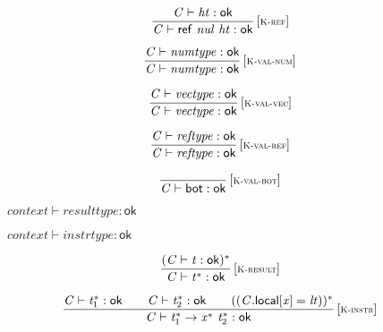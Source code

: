 $$
\begin{array}{@{}c@{}}\displaystyle
\frac{
{\mathit{C}} \vdash {\mathit{ht}} : \mathsf{ok}
}{
{\mathit{C}} \vdash \mathsf{ref}~{\mathit{nul}}~{\mathit{ht}} : \mathsf{ok}
} \, {[\textsc{\scriptsize K{-}ref}]}
\qquad
\end{array}
$$

$$
\begin{array}{@{}c@{}}\displaystyle
\frac{
{\mathit{C}} \vdash {\mathit{numtype}} : \mathsf{ok}
}{
{\mathit{C}} \vdash {\mathit{numtype}} : \mathsf{ok}
} \, {[\textsc{\scriptsize K{-}val{-}num}]}
\qquad
\end{array}
$$

$$
\begin{array}{@{}c@{}}\displaystyle
\frac{
{\mathit{C}} \vdash {\mathit{vectype}} : \mathsf{ok}
}{
{\mathit{C}} \vdash {\mathit{vectype}} : \mathsf{ok}
} \, {[\textsc{\scriptsize K{-}val{-}vec}]}
\qquad
\end{array}
$$

$$
\begin{array}{@{}c@{}}\displaystyle
\frac{
{\mathit{C}} \vdash {\mathit{reftype}} : \mathsf{ok}
}{
{\mathit{C}} \vdash {\mathit{reftype}} : \mathsf{ok}
} \, {[\textsc{\scriptsize K{-}val{-}ref}]}
\qquad
\end{array}
$$

$$
\begin{array}{@{}c@{}}\displaystyle
\frac{
}{
{\mathit{C}} \vdash \mathsf{bot} : \mathsf{ok}
} \, {[\textsc{\scriptsize K{-}val{-}bot}]}
\qquad
\end{array}
$$

\vspace{1ex}

$\boxed{{\mathit{context}} \vdash {\mathit{resulttype}} : \mathsf{ok}}$

$\boxed{{\mathit{context}} \vdash {\mathit{instrtype}} : \mathsf{ok}}$

$$
\begin{array}{@{}c@{}}\displaystyle
\frac{
({\mathit{C}} \vdash {\mathit{t}} : \mathsf{ok})^\ast
}{
{\mathit{C}} \vdash {{\mathit{t}}^\ast} : \mathsf{ok}
} \, {[\textsc{\scriptsize K{-}result}]}
\qquad
\end{array}
$$

$$
\begin{array}{@{}c@{}}\displaystyle
\frac{
{\mathit{C}} \vdash {{\mathit{t}}_{{1}}^\ast} : \mathsf{ok}
 \qquad
{\mathit{C}} \vdash {{\mathit{t}}_{{2}}^\ast} : \mathsf{ok}
 \qquad
(({\mathit{C}}.\mathsf{local}[{\mathit{x}}] = {\mathit{lt}}))^\ast
}{
{\mathit{C}} \vdash {{\mathit{t}}_{{1}}^\ast} \rightarrow {{\mathit{x}}^\ast}~{{\mathit{t}}_{{2}}^\ast} : \mathsf{ok}
} \, {[\textsc{\scriptsize K{-}instr}]}
\qquad
\end{array}
$$

